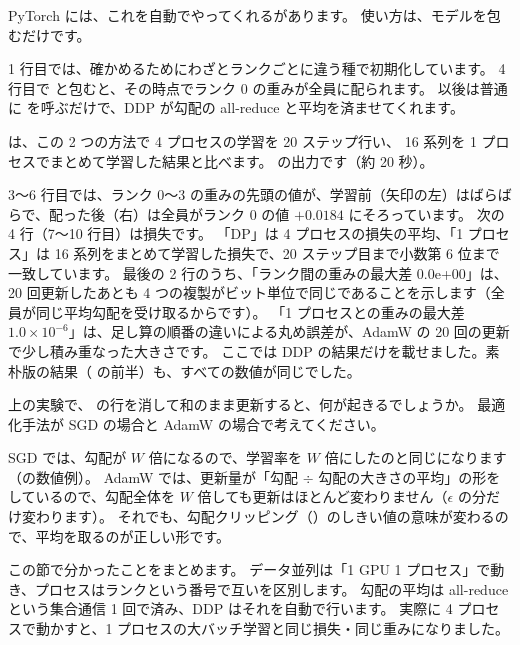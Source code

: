PyTorch には、これを自動でやってくれるがあります\cite{li2020pytorch}。
使い方は、モデルを包むだけです。


1 行目では、確かめるためにわざとランクごとに違う種で初期化しています。
4 行目で  と包むと、その時点でランク 0 の重みが全員に配られます。
以後は普通に  を呼ぶだけで、DDP が勾配の all-reduce と平均を済ませてくれます。

 は、この 2 つの方法で 4 プロセスの学習を 20 ステップ行い、
16 系列を 1 プロセスでまとめて学習した結果と比べます。
 の出力です（約 20 秒）。


3〜6 行目では、ランク 0〜3 の重みの先頭の値が、学習前（矢印の左）はばらばらで、配った後（右）は全員がランク 0 の値 $+0.0184$ にそろっています。
次の 4 行（7〜10 行目）は損失です。
「DP」は 4 プロセスの損失の平均、「1 プロセス」は 16 系列をまとめて学習した損失で、20 ステップ目まで小数第 6 位まで一致しています。
最後の 2 行のうち、「ランク間の重みの最大差 0.0e+00」は、20 回更新したあとも 4 つの複製がビット単位で同じであることを示します（全員が同じ平均勾配を受け取るからです）。
「1 プロセスとの重みの最大差 $1.0\times10^{-6}$」は、足し算の順番の違いによる丸め誤差が、AdamW の 20 回の更新で少し積み重なった大きさです。
ここでは DDP の結果だけを載せました。素朴版の結果（ の前半）も、すべての数値が同じでした。

\begin{quiz}
上の実験で、 の行を消して和のまま更新すると、何が起きるでしょうか。
最適化手法が SGD の場合と AdamW の場合で考えてください。
\end{quiz}

SGD では、勾配が $W$ 倍になるので、学習率を $W$ 倍にしたのと同じになります（の数値例）。
AdamW では、更新量が「勾配 $\div$ 勾配の大きさの平均」の形をしているので、勾配全体を $W$ 倍しても更新はほとんど変わりません（$\epsilon$ の分だけ変わります）。
それでも、勾配クリッピング（）のしきい値の意味が変わるので、平均を取るのが正しい形です。

この節で分かったことをまとめます。
データ並列は「1 GPU 1 プロセス」で動き、プロセスはランクという番号で互いを区別します。
勾配の平均は all-reduce という集合通信 1 回で済み、DDP はそれを自動で行います。
実際に 4 プロセスで動かすと、1 プロセスの大バッチ学習と同じ損失・同じ重みになりました。

